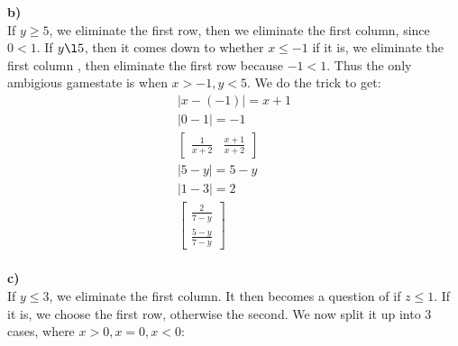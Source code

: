 \documentclass[12pt]{article}
\begin{document}
\textbf{b) }\\
If $y \ge 5$, we eliminate the first row, then we eliminate the first column, since $0 < 1$.
If $y \l 5$, then it comes down to whether $x \le -1$ if it is, we eliminate the first column
, then eliminate the first row because  $-1 < 1$. Thus the only ambigious gamestate is when
 $x > -1, y < 5$. We do the trick to get: 
\begin{align}
 |x-(-1)| = x+1 \\
 |0 - 1| = -1 \\
 \begin{bmatrix}
	 \frac{1}{x+2} & 
	 \frac{x+1}{x+2}
 \end{bmatrix}\\
 |5-y| = 5-y \\
 |1-3| = 2 \\
 \begin{bmatrix}
 	\frac{2}{7-y}\\
 	\frac{5-y}{7-y}
 \end{bmatrix}
\end{align}\\

\textbf{c) } \\
If $y \le 3$, we eliminate the first column. It then becomes a question of if $z \le 1$. If it is, we choose the first row,
otherwise the second. We now split it up into 3 cases, where $x > 0, x = 0, x < 0$:\\
\end{document}
